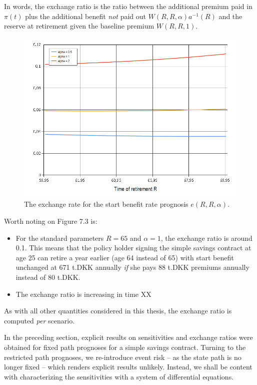 \documentclass{article}
\newcommand{\1}[1]{\mathbbm{1}_{\left\lbrace #1 \right\rbrace}}
\theoremstyle{break}
\theoremstyle{remark}
\newenvironment{remark}
  {\pushQED{\qed}\renewcommand{\qedsymbol}{\scalebox{1.4}{$\circ$}}\remarkx}
  {\popQED\endremarkx}
\numberwithin{equation}{section}
\begin{document}
In words, the exchange ratio is the ratio between the additional premium paid in $\pi(t)$ plus the additional benefit \textit{not} paid out $W(R,R,\alpha) a^{-1}(R)$ and the reserve at retirement given the baseline premium $W(R,R,1)$.

\begin{figure}[H]
	\centering
	\caption{The exchange rate for the start benefit rate prognosis $e(R,R,\alpha)$.}
	\includegraphics[width=\textwidth]{Exchange}		
\end{figure}

Worth noting on Figure 7.3 is:

\begin{itemize}
	\item For the standard parameters $R=65$ and $\alpha=1$, the exchange ratio is around 0.1. This means that the policy holder signing the simple savings contract at age 25 can retire a year earlier (age 64 instead of 65) with start benefit unchanged at 671 t.DKK annually \textit{if} she pays 88 t.DKK premiums annually instead of 80 t.DKK.
	\item The exchange ratio is increasing in time XX
\end{itemize}


\begin{remark}
	As with all other quantities considered in this thesis, the exchange ratio is computed \textit{per} scenario.
\end{remark}

In the preceding section, explicit results on sensitivities and exchange ratios were obtained for fixed path prognoses for a simple savings contract. Turning to the restricted path prognoses, we re-introduce event risk -- as the state path is no longer fixed -- which renders explicit results unlikely. Instead, we shall be content with characterizing the sensitivities with a system of differential equations.
\end{document}
